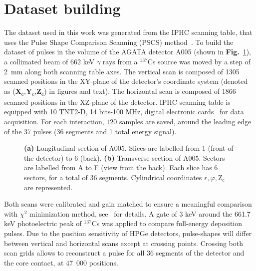 \section{Dataset building}
\label{sec:dataset_building}
The dataset used in this work was generated from the IPHC scanning table, that uses the Pulse Shape Comparison Scanning (PSCS) method~\cite{Crespi2008}. To build the dataset of pulses in the volume of the AGATA detector A005 (shown in \textbf{Fig.}~\ref{fig:a005_geometry}), a collimated beam of 662 keV $\gamma$ rays from a $^{137}$Cs source was moved by a step of 2~mm along both scanning table axes. The vertical scan is composed of 1305 scanned positions in the XY-plane of the detector's coordinate system (denoted as (\textbf{X}\textsubscript{c},\textbf{Y}\textsubscript{c},\textbf{Z}\textsubscript{c}) in figures and text). The horizontal scan is composed of 1866 scanned positions in the XZ-plane of the detector. IPHC scanning table is equipped with 10 TNT2-D, 14 bits-100 MHz, digital electronic cards~\cite{Arnold2005} for data acquisition. For each interaction, $120$ samples are saved, around the leading edge of the 37 pulses (36 segments and 1 total energy signal).

\begin{figure}
\centering
{}
\caption{\textbf{(a)} Longitudinal section of A005. Slices are labelled from 1 (front of the detector) to 6 (back). \textbf{(b)} Transverse section of A005. Sectors are labelled from A to F (view from the back). Each slice has 6 sectors, for a total of 36 segments. Cylindrical coordinates $r, \varphi, \text{Z}_\text{c}$ are represented. }
\label{fig:a005_geometry}
\end{figure}

Both scans were calibrated and gain matched to ensure a meaningful comparison with $\chi^2$ minimization method, see~\cite{DeCanditiis2020SimulationsDetector} for details. A gate of 3 keV around the 661.7 keV photoelectric peak of $^{137}$Cs was applied to compare full-energy deposition pulses. Due to the position sensitivity of HPGe detectors, pulse-shapes will differ between vertical and horizontal scans except at crossing points. Crossing both scan grids allows to reconstruct a pulse for all 36 segments of the detector and the core contact, at 47~000 positions. 

